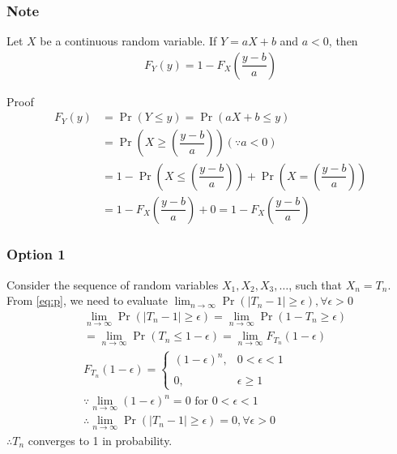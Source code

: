 \documentclass{beamer}
\providecommand{\pr}[1]{\ensuremath{\Pr\left(#1\right)}}
\providecommand{\brak}[1]{\ensuremath{\left(#1\right)}}
\begin{document}
\begin{frame}
\frametitle{Note}
\begin{block}{}
Let $X$ be a continuous random variable. If $Y=aX+b$ and $a<0$, then
\begin{align}
\label{eq:form}
    F_{Y}(y)=1-F_{X}\brak{\dfrac{y-b}{a}}
\end{align}
\end{block}
\begin{block}{Proof}
    \begin{align}
        F_{Y}(y)&=\pr{Y\leq y}=\pr{aX+b \leq y}\\
        &=\pr{X \geq\brak{\dfrac{y-b}{a}}}\brak{\because a<0}\\
        &=1-\pr{X \leq\brak{\dfrac{y-b}{a}}}+\pr{X =\brak{\dfrac{y-b}{a}}}\\
        &=1-F_{X}\brak{\dfrac{y-b}{a}}+0=1-F_{X}\brak{\dfrac{y-b}{a}}
    \end{align}
\end{block}
\end{frame}

\begin{frame}
\frametitle{Option 1}
Consider the sequence of random variables $X_{1},X_{2},X_{3},\dots$, such that $X_{n}=T_{n}$. From \eqref{eq:p}, we need to evaluate $\displaystyle\lim_{n\to\infty}\pr{|T_{n}-1|\geq\epsilon},\forall\epsilon>0$
\begin{align}
    &\displaystyle\lim_{n\to\infty}\pr{|T_{n}-1|\geq\epsilon}=\displaystyle\lim_{n\to\infty}\pr{1-T_{n}\geq\epsilon}\\
    &=\displaystyle\lim_{n\to\infty}\pr{T_{n}\leq1-\epsilon}=\displaystyle\lim_{n\to\infty}F_{T_{n}}(1-\epsilon)\\
    &F_{T_{n}}(1-\epsilon)=\begin{cases}
	(1-\epsilon)^{n}, & 0< \epsilon<1 \\~\\[-1em]
	0, & \epsilon\geq 1
	\end{cases}\\
    &\because\displaystyle\lim_{n\to\infty}(1-\epsilon)^{n}=0 \text{ for } 0< \epsilon<1\\
    &\therefore \displaystyle\lim_{n\to\infty}\pr{|T_{n}-1|\geq\epsilon}=0,\forall\epsilon>0
\end{align}
$\therefore T_{n}$ converges to 1 in probability.
\end{frame}
\end{document}
